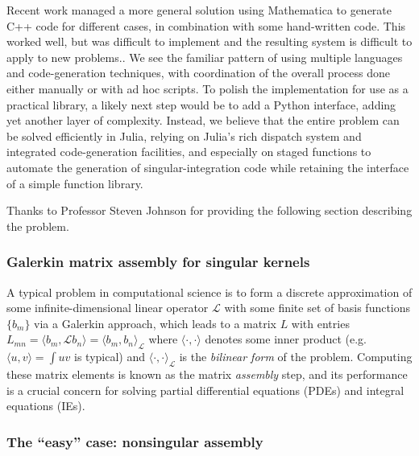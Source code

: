 Recent work \cite{ReidWhJo14} managed a more general solution
using Mathematica to generate C++ code for different cases, in combination with some hand-written code.
This worked well, but was difficult to implement and the resulting system
is difficult to apply to new problems..
We see the familiar pattern of using multiple languages and
code-generation techniques, with coordination of the overall process done
either manually or with ad hoc scripts.
To polish the implementation for use as a practical library, a likely next
step would be to add a Python interface, adding yet another layer of complexity.
Instead, we believe that the entire problem can be solved efficiently in Julia,
relying on Julia's rich dispatch system and integrated code-generation facilities,
and especially on staged functions to automate the generation of singular-integration
code while retaining the interface of a simple function library.



Thanks to Professor Steven Johnson for providing the following section describing
the problem.

\subsubsection{Galerkin matrix assembly for singular kernels}

A typical problem in computational science is to form a discrete approximation
of some infinite-dimensional linear operator $\mathcal{L}$ with some finite set of
basis functions $\{ b_m \}$ via a Galerkin approach\cite{Boyd01,Bonnet99,Zienkiewicz13}, which leads to a
matrix $L$ with entries
$L_{mn} = \langle b_m, \mathcal{L} b_n \rangle = \langle b_m, b_n \rangle_\mathcal{L}$
where $\langle \cdot, \cdot \rangle$ denotes some inner product
(e.g.\ $\langle u, v \rangle = \int u v$ is typical) and
$\langle \cdot, \cdot \rangle_\mathcal{L}$ is the \emph{bilinear form} of the problem.
Computing these matrix elements is known as the matrix \emph{assembly} step, and its
performance is a crucial concern for solving partial differential equations (PDEs) and
integral equations (IEs).

\iffalse
\subsubsection{The ``easy'' case: nonsingular assembly}

